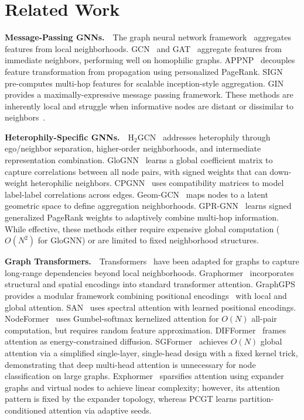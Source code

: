\section{Related Work}

\textbf{Message-Passing GNNs.}~~The graph neural network framework~\citep{scarselli2009gnn, gilmer2017mpnn} aggregates features from local neighborhoods. GCN~\citep{kipf2017semi} and GAT~\citep{velickovic2018gat} aggregate features from immediate neighbors, performing well on homophilic graphs. APPNP~\citep{klicpera2019appnp} decouples feature transformation from propagation using personalized PageRank. SIGN~\citep{rossi2020sign} pre-computes multi-hop features for scalable inception-style aggregation. GIN~\citep{xu2019powerful} provides a maximally-expressive message passing framework. These methods are inherently local and struggle when informative nodes are distant or dissimilar to neighbors~\citep{li2018oversmoothing}.

\textbf{Heterophily-Specific GNNs.}~~H$_2$GCN~\citep{zhu2020h2gcn} addresses heterophily through ego/neighbor separation, higher-order neighborhoods, and intermediate representation combination. GloGNN~\citep{li2022glognn} learns a global coefficient matrix to capture correlations between all node pairs, with signed weights that can down-weight heterophilic neighbors. CPGNN~\citep{zhu2021cpgnn} uses compatibility matrices to model label-label correlations across edges. Geom-GCN~\citep{pei2020geomgcn} maps nodes to a latent geometric space to define aggregation neighborhoods. GPR-GNN~\citep{chien2021gprgnn} learns signed generalized PageRank weights to adaptively combine multi-hop information. While effective, these methods either require expensive global computation ($O(N^2)$ for GloGNN) or are limited to fixed neighborhood structures.

\textbf{Graph Transformers.}~~Transformers~\citep{vaswani2017attention} have been adapted for graphs to capture long-range dependencies beyond local neighborhoods. Graphormer~\citep{ying2021graphormer} incorporates structural and spatial encodings into standard transformer attention. GraphGPS~\citep{rampasek2022graphgps} provides a modular framework combining positional encodings~\citep{dwivedi2022lspe} with local and global attention. SAN~\citep{kreuzer2021rethinking} uses spectral attention with learned positional encodings. NodeFormer~\citep{wu2022nodeformer} uses Gumbel-softmax kernelized attention for $O(N)$ all-pair computation, but requires random feature approximation. DIFFormer~\citep{wu2023difformer} frames attention as energy-constrained diffusion. SGFormer~\citep{wu2023sgformer} achieves $O(N)$ global attention via a simplified single-layer, single-head design with a fixed kernel trick, demonstrating that deep multi-head attention is unnecessary for node classification on large graphs. Exphormer~\citep{shirzad2023exphormer} sparsifies attention using expander graphs and virtual nodes to achieve linear complexity; however, its attention pattern is fixed by the expander topology, whereas PCGT learns partition-conditioned attention via adaptive seeds.

